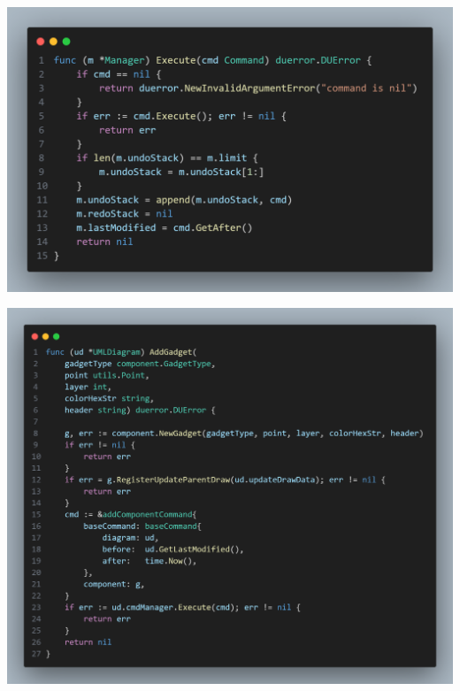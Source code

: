 \documentclass[12pt]{article}
\begin{document}
    \begin{center}
        \includegraphics[width=0.95\linewidth]
        {assets/hw7/syscode1.png}
    \end{center}

    \begin{center}
        \includegraphics[width=0.95\linewidth]
        {assets/hw7/syscode2.png}
    \end{center}
\end{document}
